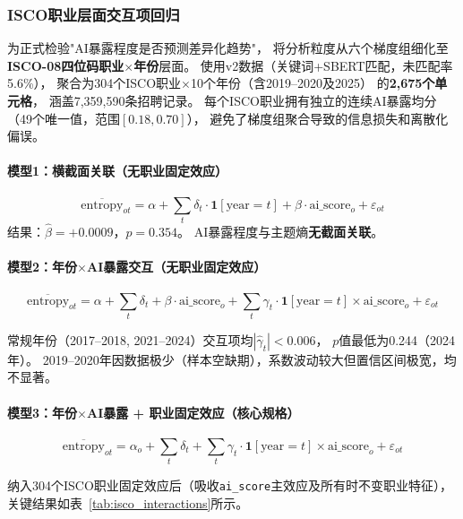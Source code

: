\documentclass[12pt,a4paper]{ctexart}
\begin{document}
\subsubsection{ISCO职业层面交互项回归}

为正式检验"AI暴露程度是否预测差异化趋势"，
将分析粒度从六个梯度组细化至\textbf{ISCO-08四位码职业$\times$年份}层面。
使用v2数据（关键词+SBERT匹配，未匹配率5.6\%），
聚合为304个ISCO职业$\times$10个年份（含2019--2020及2025）
的\textbf{2,675个单元格}，
涵盖7,359,590条招聘记录。
每个ISCO职业拥有独立的连续AI暴露均分（49个唯一值，范围$[0.18, 0.70]$），
避免了梯度组聚合导致的信息损失和离散化偏误。

\paragraph{模型1：横截面关联（无职业固定效应）}
\[
\overline{\text{entropy}}_{ot} = \alpha + \sum_{t} \delta_t \cdot \mathbf{1}[\text{year}=t]
+ \beta \cdot \text{ai\_score}_o + \varepsilon_{ot}
\]
结果：$\hat{\beta} = +0.0009$，$p = 0.354$。
AI暴露程度与主题熵\textbf{无截面关联}。

\paragraph{模型2：年份$\times$AI暴露交互（无职业固定效应）}
\[
\overline{\text{entropy}}_{ot} = \alpha + \sum_{t} \delta_t + \beta \cdot \text{ai\_score}_o
+ \sum_{t} \gamma_t \cdot \mathbf{1}[\text{year}=t] \times \text{ai\_score}_o
+ \varepsilon_{ot}
\]

常规年份（2017--2018, 2021--2024）交互项均$|\hat{\gamma}_t| < 0.006$，
$p$值最低为0.244（2024年）。
2019--2020年因数据极少（样本空缺期），系数波动较大但置信区间极宽，均不显著。

\paragraph{模型3：年份$\times$AI暴露 + 职业固定效应（核心规格）}
\[
\overline{\text{entropy}}_{ot} = \alpha_o + \sum_{t} \delta_t
+ \sum_{t} \gamma_t \cdot \mathbf{1}[\text{year}=t] \times \text{ai\_score}_o
+ \varepsilon_{ot}
\]

纳入304个ISCO职业固定效应后（吸收\texttt{ai\_score}主效应及所有时不变职业特征），
关键结果如表~\ref{tab:isco_interactions}所示。
\end{document}

